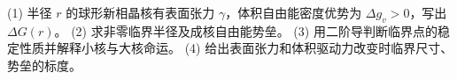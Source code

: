 (1) 半径 \(r\) 的球形新相晶核有表面张力 \(\gamma\)，体积自由能密度优势为 \(\Delta g_v>0\)，写出 \(\Delta G(r)\)。
(2) 求非零临界半径及成核自由能势垒。
(3) 用二阶导判断临界点的稳定性质并解释小核与大核命运。
(4) 给出表面张力和体积驱动力改变时临界尺寸、势垒的标度。
